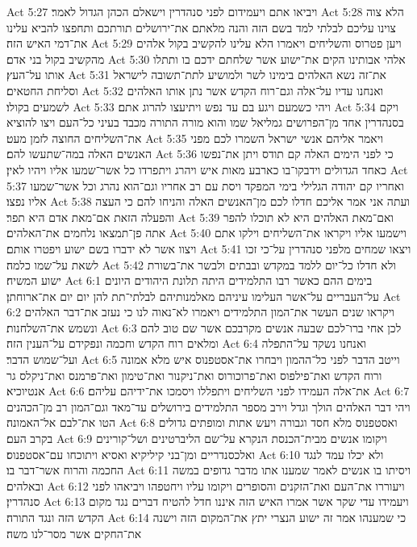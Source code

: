 Act 5:27  ויביאו אתם ויעמידום לפני סנהדרין וישאלם הכהן הגדול לאמר׃
Act 5:28  הלא צוה צוינו עליכם לבלתי למד בשם הזה והנה מלאתם את־ירושלים תורתכם ותחפצו להביא עלינו את־דמי האיש הזה׃
Act 5:29  ויען פטרוס והשליחים ויאמרו הלא עלינו להקשיב בקול אלהים מהקשיב בקול בני אדם׃
Act 5:30  אלהי אבותינו הקים את־ישוע אשר שלחתם ידכם בו ותתלו אותו על־העץ׃
Act 5:31  את־זה נשא האלהים בימינו לשר ולמושיע לתת־תשובה לישראל וסליחת החטאים׃
Act 5:32  ואנחנו עדיו על־אלה וגם־רוח הקדש אשר נתן אותו האלהים לשמעים בקולו׃
Act 5:33  ויהי כשמעם ויגע בם עד נפש ויתיעצו להרוג אתם׃
Act 5:34  ויקם בסנהדרין אחד מן־הפרושים גמליאל שמו והוא מורה התורה מכבד בעיני כל־העם ויצו להוציא את־השליחים החוצה לזמן מעט׃
Act 5:35  ויאמר אליהם אנשי ישראל השמרו לכם מפני האנשים האלה במה־שתעשו להם׃
Act 5:36  כי לפני הימים האלה קם תודס ויתן את־נפשו כאחד הגדולים וידבקו־בו כארבע מאות איש ויהרג ויתפרדו כל אשר־שמעו אליו ויהיו לאין׃
Act 5:37  ואחריו קם יהודה הגלילי בימי המפקד ויסת עם רב אחריו וגם־הוא נהרג וכל אשר־שמעו אליו נפצו׃
Act 5:38  ועתה אני אמר אליכם חדלו לכם מן־האנשים האלה והניחו להם כי העצה והפעלה הזאת אם־מאת אדם היא תפר׃
Act 5:39  ואם־מאת האלהים היא לא תוכלו להפר אתה פן־תמצאו נלחמים את־האלהים׃
Act 5:40  וישמעו אליו ויקראו את־השליחים וילקו אתם ויצוו אשר לא ידברו בשם ישוע ויפטרו אותם׃
Act 5:41  ויצאו שמחים מלפני סנהדרין על־כי זכו לשאת על־שמו כלמה׃
Act 5:42  ולא חדלו כל־יום ללמד במקדש ובבתים ולבשר את־בשורת ישוע המשיח׃
Act 6:1  בימים ההם כאשר רבו התלמידים היתה תלונת היהודים היונים על־העבריים על־אשר העלימו עיניהם מאלמנותיהם לבלתי־תת להן יום יום את־ארוחתן׃
Act 6:2  ויקראו שנים העשר את־המון התלמידים ויאמרו לא־נאוה לנו כי נעזב את־דבר האלהים ונשמש את־השלחנות׃
Act 6:3  לכן אחי ברו־לכם שבעה אנשים מקרבכם אשר שם טוב להם ומלאים רוח הקדש וחכמה ונפקידם על־הענין הזה׃
Act 6:4  ואנחנו נשקד על־התפלה ועל־שמוש הדבר׃
Act 6:5  וייטב הדבר לפני כל־ההמון ויבחרו את־אסטפנוס איש מלא אמונה ורוח הקדש ואת־פילפוס ואת־פרוכורוס ואת־ניקנור ואת־טימון ואת־פרמנס ואת־ניקלס גר אנטיוכיא׃
Act 6:6  את־אלה העמידו לפני השליחים ויתפללו ויסמכו את־ידיהם עליהם׃
Act 6:7  ויהי דבר האלהים הולך וגדל וירב מספר התלמידים בירושלים עד־מאד וגם־המון רב מן־הכהנים הטו את־לבם אל־האמונה׃
Act 6:8  ואסטפנוס מלא חסד וגבורה ויעש אתות ומופתים גדולים בקרב העם׃
Act 6:9  ויקומו אנשים מבית־הכנסת הנקרא על־שם הליברטינים ושל־קורינים ואלכסנדריים ומן־בני קיליקיא ואסיא ויתוכחו עם־אסטפנוס׃
Act 6:10  ולא יכלו עמד לנגד החכמה והרוח אשר־דבר בו׃
Act 6:11  ויסיתו בו אנשים לאמר שמענו אתו מדבר גדופים במשה ובאלהים׃
Act 6:12  ויעוררו את־העם ואת־הזקנים והסופרים ויקומו עליו ויחטפהו ויביאהו לפני סנהדרין׃
Act 6:13  ויעמידו עדי שקר אשר אמרו האיש הזה איננו חדל להטיח דברים נגד מקום הקדש הזה ונגד התורה׃
Act 6:14  כי שמענהו אמר זה ישוע הנצרי יתץ את־המקום הזה וישנה את־החקים אשר מסר־לנו משה׃
